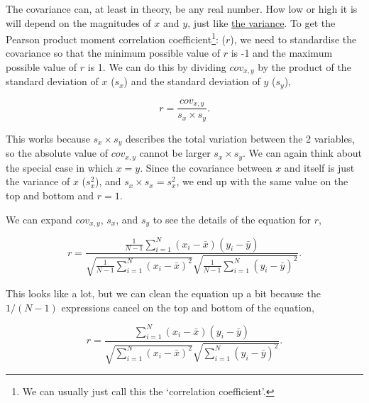 \documentclass[
]{scrbook}
\begin{document}
The covariance can, at least in theory, be any real number.
How low or high it is will depend on the magnitudes of \(x\) and \(y\), just like \protect\hyperlink{the-variance}{the variance}.
To get the Pearson product moment correlation coefficient\footnote{We can usually just call this the `correlation coefficient'.}: (\(r\)), we need to standardise the covariance so that the minimum possible value of \(r\) is -1 and the maximum possible value of \(r\) is 1.
We can do this by dividing \(cov_{x,y}\) by the product of the standard deviation of \(x\) (\(s_{x}\)) and the standard deviation of \(y\) (\(s_{y}\)),

\[r = \frac{cov_{x,y}}{s_{x} \times s_{y}}.\]

This works because \(s_{x} \times s_{y}\) describes the total variation between the 2 variables, so the absolute value of \(cov_{x,y}\) cannot be larger \(s_{x} \times s_{y}\).
We can again think about the special case in which \(x = y\).
Since the covariance between \(x\) and itself is just the variance of \(x\) (\(s_{x}^{2}\)), and \(s_{x} \times s_{x} = s^{2}_{x}\), we end up with the same value on the top and bottom and \(r = 1\).

We can expand \(cov_{x,y}\), \(s_{x}\), and \(s_{y}\) to see the details of the equation for \(r\),

\[r = \frac{\frac{1}{N - 1} \sum_{i = 1}^{N}\left(x_{i} - \bar{x} \right) \left(y_{i} - \bar{y} \right)}{\sqrt{\frac{1}{N - 1}\sum_{i = 1}^{N}\left(x_{i} - \bar{x} \right)^{2}} \sqrt{\frac{1}{N - 1}\sum_{i = 1}^{N}\left(y_{i} - \bar{y} \right)^{2}}}.\]

This looks like a lot, but we can clean the equation up a bit because the \(1 / (N-1)\) expressions cancel on the top and bottom of the equation,

\[r = \frac{\sum_{i = 1}^{N}\left(x_{i} - \bar{x} \right) \left(y_{i} - \bar{y} \right)}{\sqrt{\sum_{i = 1}^{N}\left(x_{i} - \bar{x} \right)^{2}} \sqrt{\sum_{i = 1}^{N}\left(y_{i} - \bar{y} \right)^{2}}}.\]
\end{document}
